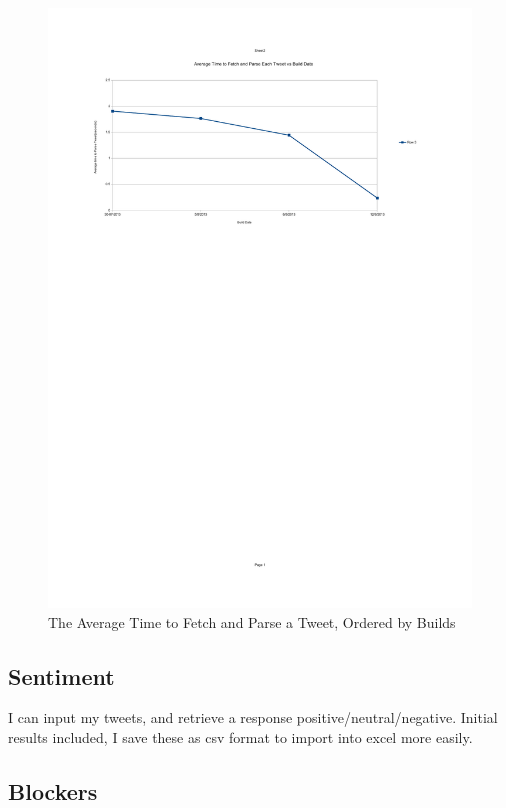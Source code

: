 \begin{figure}[h!]
\centering
\includegraphics[width=500px]{Images/average_time_to_fetch_parse_tweets_per_build.pdf}
\caption{The Average Time to Fetch and Parse a Tweet, Ordered by Builds}
\end{figure}


\subsection{Sentiment}

I can input my tweets, and retrieve a response positive/neutral/negative. Initial results included, I save these as csv format to import into excel more easily.\\

\subsection{Blockers}

